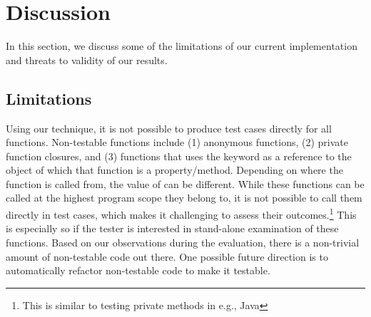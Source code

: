 \section{Discussion} \label{Sec:discussion}
In this section, we discuss some of the limitations of our current implementation and threats to validity of our results.

\subsection{Limitations}

 Using our technique, it is not possible to produce test cases directly for all \javascript functions.
Non-testable \javascript functions include (1) anonymous functions, (2) private function closures, and (3) functions that uses the  keyword as a reference to the object of which that function is a property/method. Depending on where the function is called from, the value of  can be different.
While these functions can be called at the highest program scope they belong to, it is not possible to call them directly in test cases, which makes it challenging to assess their outcomes.\footnote{This is similar to testing private methods in e.g., Java} This is especially so if the tester is interested in stand-alone examination of these functions.  Based on our observations during the evaluation, there is a non-trivial amount of non-testable \javascript code out there. One possible future direction is to automatically refactor non-testable \javascript code to make it testable. 
 
